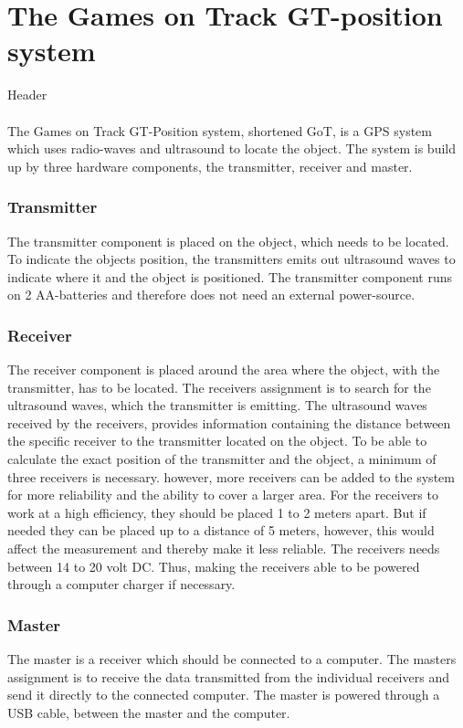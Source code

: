 \section{The Games on Track GT-position system}
Header\\\\
The Games on Track GT-Position system, shortened GoT, is a GPS system which uses radio-waves and ultrasound to locate the object. The system is build up by three hardware components, the transmitter, receiver and master. 

\subsubsection{Transmitter}
The transmitter component is placed on the object, which needs to be located. To indicate the objects position, the transmitters emits out ultrasound waves to indicate where it and the object is positioned. The transmitter component runs on 2 AA-batteries and therefore does not need an external power-source. 

\subsubsection{Receiver}
The receiver component is placed around the area where the object, with the transmitter, has to be located. The receivers assignment is to search for the ultrasound waves, which the transmitter is emitting. The ultrasound waves received by the receivers, provides information containing the distance between the specific receiver to the transmitter located on the object. To be able to calculate the exact position of the transmitter and the object, a minimum of three receivers is necessary. however, more receivers can be added to the system for more reliability and the ability to cover a larger area. For the receivers to work at a high efficiency, they should be placed 1 to 2 meters apart. But if needed they can be placed up to a distance of 5 meters, however, this would affect the measurement and thereby make it less reliable. The receivers needs between 14 to 20 volt DC. Thus, making the receivers able to be powered through a computer charger if necessary.

\subsubsection{Master}
The master is a receiver which should be connected to a computer. The masters assignment is to receive the data transmitted from the individual receivers and send it directly to the connected computer. The master is powered through a USB cable, between the master and the computer.\\\\

